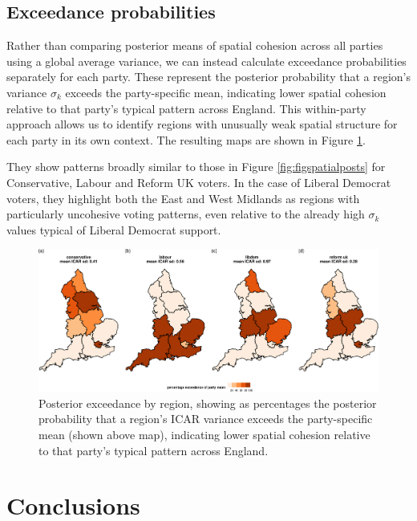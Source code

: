 \documentclass[webpdf,large,contemporary,namedate]{oup-authoring-template}
\theoremstyle{thmstyleone}
\theoremstyle{thmstyletwo}
\theoremstyle{thmstylethree}
\begin{document}
\subsection{Exceedance probabilities}\label{exceedance-probabilities}

Rather than comparing posterior means of spatial cohesion across all
parties using a global average variance, we can instead calculate
exceedance probabilities \citep{Richardson2004} separately for each
party. These represent the posterior probability that a region's
variance \(\sigma_k\) exceeds the party-specific mean, indicating lower
spatial cohesion relative to that party's typical pattern across
England. This within-party approach allows us to identify regions with
unusually weak spatial structure for each party in its own context. The
resulting maps are shown in Figure \ref{fig:figexceedances}.

They show patterns broadly similar to those in Figure
\ref{fig:figspatialposts} for Conservative, Labour and Reform UK voters.
In the case of Liberal Democrat voters, they highlight both the East and
West Midlands as regions with particularly uncohesive voting patterns,
even relative to the already high \(\sigma_k\) values typical of Liberal
Democrat support.

\begin{figure}[th]
\includegraphics[width=1\linewidth]{jrss_resubmission_files/figure-latex/figexceedances-1} \caption{Posterior exceedance by region, showing as percentages the posterior probability that a region’s ICAR variance exceeds the party-specific mean (shown above map), indicating lower spatial cohesion relative to that party’s typical pattern across England.}\label{fig:figexceedances}
\end{figure}

\section{Conclusions}\label{conclusions}
\end{document}
